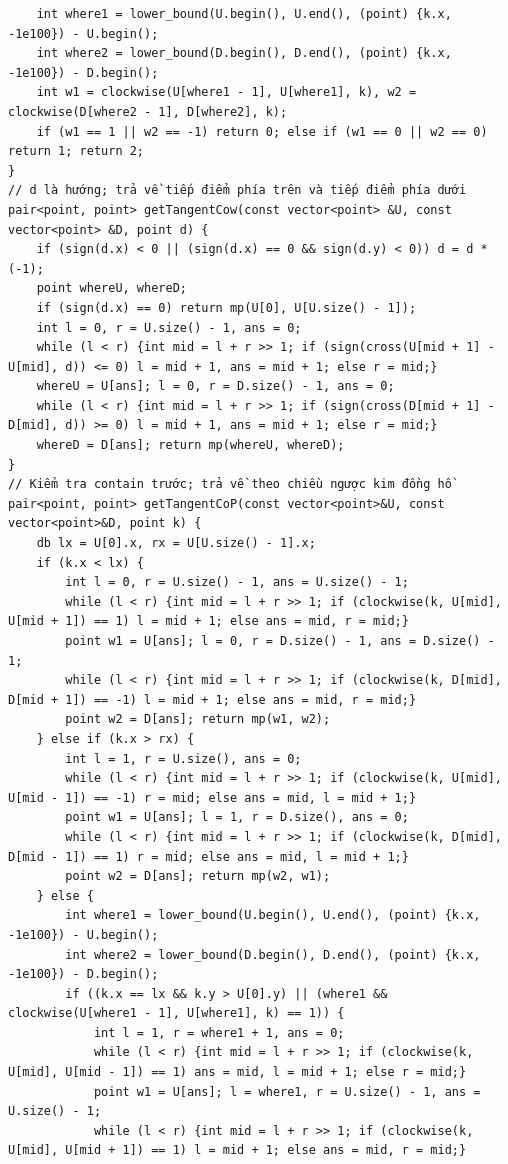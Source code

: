\documentclass[11pt]{article}
\begin{document}
\begin{verbatim}
	int where1 = lower_bound(U.begin(), U.end(), (point) {k.x, -1e100}) - U.begin();
	int where2 = lower_bound(D.begin(), D.end(), (point) {k.x, -1e100}) - D.begin();
	int w1 = clockwise(U[where1 - 1], U[where1], k), w2 = clockwise(D[where2 - 1], D[where2], k);
	if (w1 == 1 || w2 == -1) return 0; else if (w1 == 0 || w2 == 0) return 1; return 2;
}
// d là hướng; trả về tiếp điểm phía trên và tiếp điểm phía dưới
pair<point, point> getTangentCow(const vector<point> &U, const vector<point> &D, point d) {
	if (sign(d.x) < 0 || (sign(d.x) == 0 && sign(d.y) < 0)) d = d * (-1);
	point whereU, whereD;
	if (sign(d.x) == 0) return mp(U[0], U[U.size() - 1]);
	int l = 0, r = U.size() - 1, ans = 0;
	while (l < r) {int mid = l + r >> 1; if (sign(cross(U[mid + 1] - U[mid], d)) <= 0) l = mid + 1, ans = mid + 1; else r = mid;}
	whereU = U[ans]; l = 0, r = D.size() - 1, ans = 0;
	while (l < r) {int mid = l + r >> 1; if (sign(cross(D[mid + 1] - D[mid], d)) >= 0) l = mid + 1, ans = mid + 1; else r = mid;}
	whereD = D[ans]; return mp(whereU, whereD);
}
// Kiểm tra contain trước; trả về theo chiều ngược kim đồng hồ
pair<point, point> getTangentCoP(const vector<point>&U, const vector<point>&D, point k) {
	db lx = U[0].x, rx = U[U.size() - 1].x;
	if (k.x < lx) {
		int l = 0, r = U.size() - 1, ans = U.size() - 1;
		while (l < r) {int mid = l + r >> 1; if (clockwise(k, U[mid], U[mid + 1]) == 1) l = mid + 1; else ans = mid, r = mid;}
		point w1 = U[ans]; l = 0, r = D.size() - 1, ans = D.size() - 1;
		while (l < r) {int mid = l + r >> 1; if (clockwise(k, D[mid], D[mid + 1]) == -1) l = mid + 1; else ans = mid, r = mid;}
		point w2 = D[ans]; return mp(w1, w2);
	} else if (k.x > rx) {
		int l = 1, r = U.size(), ans = 0;
		while (l < r) {int mid = l + r >> 1; if (clockwise(k, U[mid], U[mid - 1]) == -1) r = mid; else ans = mid, l = mid + 1;}
		point w1 = U[ans]; l = 1, r = D.size(), ans = 0;
		while (l < r) {int mid = l + r >> 1; if (clockwise(k, D[mid], D[mid - 1]) == 1) r = mid; else ans = mid, l = mid + 1;}
		point w2 = D[ans]; return mp(w2, w1);
	} else {
		int where1 = lower_bound(U.begin(), U.end(), (point) {k.x, -1e100}) - U.begin();
		int where2 = lower_bound(D.begin(), D.end(), (point) {k.x, -1e100}) - D.begin();
		if ((k.x == lx && k.y > U[0].y) || (where1 && clockwise(U[where1 - 1], U[where1], k) == 1)) {
			int l = 1, r = where1 + 1, ans = 0;
			while (l < r) {int mid = l + r >> 1; if (clockwise(k, U[mid], U[mid - 1]) == 1) ans = mid, l = mid + 1; else r = mid;}
			point w1 = U[ans]; l = where1, r = U.size() - 1, ans = U.size() - 1;
			while (l < r) {int mid = l + r >> 1; if (clockwise(k, U[mid], U[mid + 1]) == 1) l = mid + 1; else ans = mid, r = mid;}

\end{verbatim}
\end{document}
